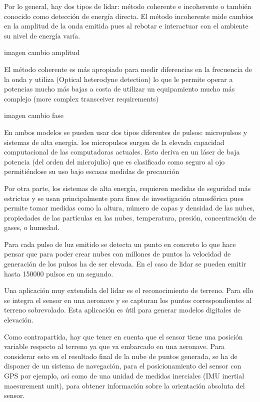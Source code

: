 Por lo general, hay dos tipos de lidar:
método coherente e incoherente o también conocido como detección de energía directa.
El método incoherente mide cambios en la amplitud de la onda emitida pues al rebotar e interactuar con el ambiente su nivel de energía varía.

imagen cambio amplitud

El método coherente es más apropiado para medir diferencias en la frecuencia de la onda y utiliza (Optical heterodyne detection) lo que le permite operar a potencias mucho más bajas a costa de utilizar un equipamiento mucho más complejo (more complex transceiver requirements)

imagen cambio fase

En ambos modelos se pueden usar dos tipos diferentes de pulsos: micropulsos y sistemas de alta energía.
los micropulsos surgen de la elevada capacidad computacional de las computadoras actuales. Esto deriva en un láser de baja potencia (del orden del microjulio) que es clasificado como seguro al ojo permitiéndose su uso bajo escasas medidas de precaución 

Por otra parte, los sistemas de alta energía, requieren medidas de seguridad más estrictas y se usan principalmente para fines de investigación atmosférica pues permite tomar medidas como la altura, número de capas y densidad de las nubes, propiedades de las partículas en las nubes, temperatura, presión, concentración de gases, o humedad.

Para cada pulso de luz emitido se detecta un punto en concreto lo que hace pensar que para poder crear nubes con millones de puntos la velocidad de generación de los pulsos ha de ser elevada. En el caso de lidar se pueden emitir hasta 150000 pulsos en un segundo.

Una aplicación muy extendida del lidar es el reconocimiento de terreno. Para ello se integra el sensor en una aeronave y se capturan los puntos correspondientes al terreno sobrevolado. Esta aplicación es útil para generar modelos digitales de elevación.

Como contrapartida, hay que tener en cuenta que el sensor tiene una posición variable respecto al terreno ya que va embarcado en una aeronave. Para considerar esto en el resultado final de la nube de puntos generada, se ha de disponer de un sistema de navegación, para el posicionamiento del sensor con GPS por ejemplo, así como de una unidad de medidas inerciales (IMU inertial maesurement unit), para obtener información sobre la orientación absoluta del sensor.


